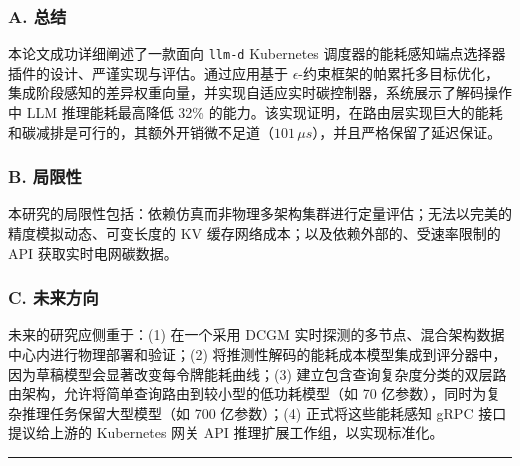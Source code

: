 \subsubsection{A. 总结}\label{a.-summary}

本论文成功详细阐述了一款面向 \texttt{llm-d} Kubernetes 调度器的能耗感知端点选择器插件的设计、严谨实现与评估。通过应用基于 \(\epsilon\)-约束框架的帕累托多目标优化，集成阶段感知的差异权重向量，并实现自适应实时碳控制器，系统展示了解码操作中 LLM 推理能耗最高降低 32\% 的能力。该实现证明，在路由层实现巨大的能耗和碳减排是可行的，其额外开销微不足道（\(101\,\mu s\)），并且严格保留了延迟保证。

\subsubsection{B. 局限性}\label{b.-limitations}

本研究的局限性包括：依赖仿真而非物理多架构集群进行定量评估；无法以完美的精度模拟动态、可变长度的 KV 缓存网络成本；以及依赖外部的、受速率限制的 API 获取实时电网碳数据。

\subsubsection{C. 未来方向}\label{c.-future-directions}

未来的研究应侧重于：(1) 在一个采用 DCGM 实时探测的多节点、混合架构数据中心内进行物理部署和验证；(2) 将推测性解码的能耗成本模型集成到评分器中，因为草稿模型会显著改变每令牌能耗曲线；(3) 建立包含查询复杂度分类的双层路由架构，允许将简单查询路由到较小型的低功耗模型（如 70 亿参数），同时为复杂推理任务保留大型模型（如 700 亿参数）；(4) 正式将这些能耗感知 gRPC 接口提议给上游的 Kubernetes 网关 API 推理扩展工作组，以实现标准化。

\begin{center}\rule{0.5\linewidth}{0.5pt}\end{center}

